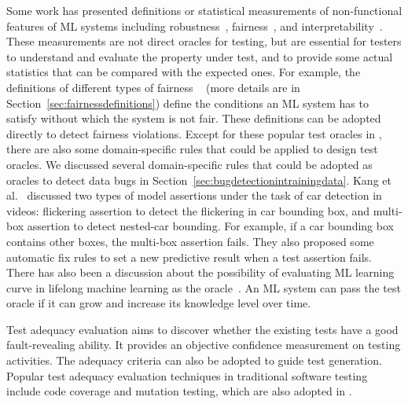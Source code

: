 \label{sec:modelevaluationmetrics}
Some work has presented definitions or statistical measurements of non-functional features of ML systems including robustness~, fairness~, and interpretability~.
These measurements are not direct oracles for testing, but are essential for testers to understand and evaluate the property under test, and to provide some actual statistics that can be compared with the expected ones.
For example, the definitions of different types of fairness ~ (more details are in Section~\ref{sec:fairnessdefinitions}) define the conditions an ML system has to satisfy without which the system is not fair. 
These definitions can be adopted directly to detect fairness violations. 
Except for these popular test oracles in \mlt{}, 
there are also some domain-specific rules that could be applied to design test oracles.
We discussed several domain-specific rules that could be adopted as oracles to detect data bugs in Section~\ref{sec:bugdetectionintrainingdata}.
Kang et al.~ discussed two types of model assertions under the task of car detection in videos:
flickering assertion to detect the flickering in car bounding box, and multi-box assertion to detect nested-car bounding. 
For example, if a car bounding box contains other boxes, the multi-box assertion fails.
They also proposed some automatic fix rules to set a new predictive result when a test assertion fails.
There has also been a discussion about the possibility of evaluating ML learning curve in lifelong machine learning as the oracle~.
An ML system can pass the test oracle if it can grow and increase its knowledge level over
time.

\label{sec:evaluation}
Test adequacy evaluation aims to discover whether the existing tests have a good fault-revealing ability.
It provides an objective confidence measurement on testing activities.
The adequacy criteria can also be adopted to guide test generation.
Popular test adequacy evaluation techniques in traditional software testing include code coverage and mutation testing, which are also adopted in \mlt{}.


